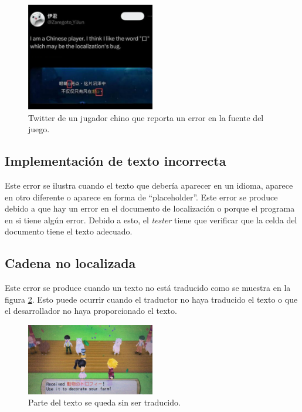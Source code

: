 \begin{figure}[H]
	\centering
	\includegraphics[width = 0.5\textwidth]{Imagenes/Errores_Localizacion/E_Font.png}
	\caption{Twitter de un jugador chino que reporta un error en la fuente del juego.}
	\label{fig:EFont}
\end{figure}

\subsection{Implementación de texto incorrecta}\label{ErrorImpIncorrecta}
Este error se ilustra cuando el texto que debería aparecer en un idioma, aparece en otro diferente o aparece en forma de ``placeholder''. Este error se produce debido a que hay un error en el documento de localización o porque el programa en si tiene algún error. Debido a esto, el \textit{tester} tiene que verificar que la celda del documento tiene el
texto adecuado.
\subsection{Cadena no localizada}\label{ErrorNoLocalizada}
Este error se produce cuando un texto no está traducido como se muestra en la figura \ref{fig:EImplementacion_Incorrecta}. Esto puede ocurrir cuando el traductor no haya traducido el texto o que el desarrollador no haya proporcionado el texto. 
\begin{figure}[H]
	\centering
	\includegraphics[width = 0.5\textwidth]{Imagenes/Errores_Localizacion/E_Implementacion_Incorrecta.png}
	\caption{Parte del texto se queda sin ser traducido.}
	\label{fig:EImplementacion_Incorrecta}
\end{figure}

